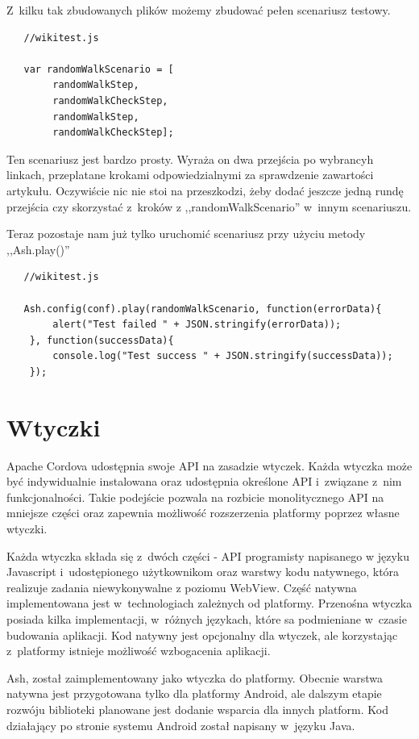 \documentclass[brudnopis]{xmgr}
\begin{document}
Z~kilku tak zbudowanych plików możemy zbudować pełen scenariusz testowy.

\begin{lstlisting}
   //wikitest.js

   var randomWalkScenario = [
        randomWalkStep,
        randomWalkCheckStep,
        randomWalkStep,
        randomWalkCheckStep];

\end{lstlisting}

Ten scenariusz jest bardzo prosty. Wyraża on dwa przejścia po wybrancyh linkach, przeplatane krokami odpowiedzialnymi za sprawdzenie zawartości artykułu. Oczywiście nic nie stoi na przeszkodzi, żeby dodać jeszcze jedną rundę przejścia czy skorzystać z~kroków z ,,randomWalkScenario'' w~innym scenariuszu.

Teraz pozostaje nam już tylko uruchomić scenariusz przy użyciu metody ,,Ash.play()''

\begin{lstlisting}
   //wikitest.js

   Ash.config(conf).play(randomWalkScenario, function(errorData){
        alert("Test failed " + JSON.stringify(errorData));
    }, function(successData){
        console.log("Test success " + JSON.stringify(successData));
    });

\end{lstlisting}

\chapter{Wtyczki}

Apache Cordova udostępnia swoje API na zasadzie wtyczek. Każda wtyczka może być indywidualnie instalowana oraz udostępnia określone API i~związane z~nim funkcjonalności. Takie podejście pozwala na rozbicie monolitycznego API na mniejsze części oraz zapewnia możliwość rozszerzenia platformy poprzez własne wtyczki.

Każda wtyczka składa się z~dwóch części - API programisty napisanego w języku Javascript i~udostępionego użytkownikom oraz warstwy kodu natywnego, która realizuje zadania niewykonywalne z poziomu WebView. Część natywna implementowana jest w~technologiach zależnych od platformy. Przenośna wtyczka posiada kilka implementacji, w~różnych językach, które sa podmieniane w~czasie budowania aplikacji. Kod natywny jest opcjonalny dla wtyczek, ale korzystając z~platformy istnieje możliwość wzbogacenia aplikacji.

Ash, został zaimplementowany jako wtyczka do platformy. Obecnie warstwa natywna jest przygotowana tylko dla platformy Android, ale dalszym etapie rozwóju biblioteki planowane jest dodanie wsparcia dla innych platform. Kod działający po stronie systemu Android został napisany w~języku Java.
\end{document}
